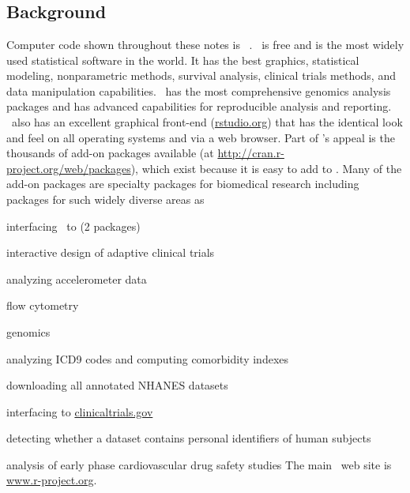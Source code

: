 

\chapter{\R}
\section{Background}
Computer code shown throughout these notes is \R~\cite{R}.  \R\ is free
and is the 
most widely used statistical software in the world.  It has the best graphics,
statistical modeling, nonparametric methods, survival analysis,
clinical trials methods, and data manipulation capabilities.  \R\ has
the most comprehensive genomics analysis packages and has advanced
capabilities for reproducible analysis and reporting.  \R\ also has an
excellent graphical front-end  (\url{rstudio.org}) that
has the identical look and feel on all operating systems and via a web
browser.  Part of
\R's appeal is the thousands of add-on packages available (at
\url{http://cran.r-project.org/web/packages}), which 
exist because it is easy to add to \R.  Many of the add-on packages
are specialty packages for biomedical research including packages for
such widely diverse areas as
\bi
\item interfacing \R\ to  (2 packages)
\item interactive design of adaptive clinical trials
\item analyzing accelerometer data
\item flow cytometry
\item genomics
\item analyzing ICD9 codes and computing comorbidity indexes
\item downloading all annotated NHANES datasets
\item interfacing to \url{clinicaltrials.gov}
\item detecting whether a dataset contains personal identifiers of
  human subjects
\item analysis of early phase cardiovascular drug safety studies
\ei
The main \R\ web site is \url{www.r-project.org}.

